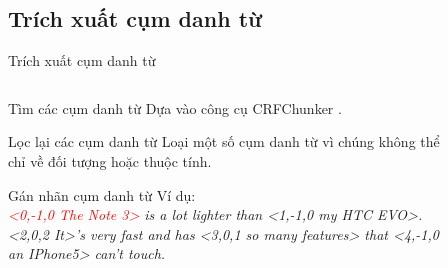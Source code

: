 \documentclass[9pt,xcolor=table,hyperref=unicode]{beamer}
\begin{document}
	\subsection{Trích xuất cụm danh từ}
	\begin{frame}{Trích xuất cụm danh từ}			
		\begin{columns}[t]
			\begin{column}{0.7\textwidth}
			   	\begin{block}{Tìm các cụm danh từ}
	   				Dựa vào công cụ CRFChunker \footnotemark.
				\end{block}
				\begin{block}{Lọc lại các cụm danh từ}
			   		Loại một số cụm danh từ vì chúng không thể chỉ về đối tượng hoặc thuộc tính.				
				\end{block}
				\begin{block}{Gán nhãn cụm danh từ}					
					Ví dụ: \\ 
					\fontsize{9pt}{9}\selectfont \textit{\textcolor{red}{<0,-1,0 The Note 3>} is a lot lighter than <1,-1,0 my HTC EVO>. <2,0,2 It>'s very fast and has <3,0,1 so many features> that <4,-1,0 an IPhone5> can't touch.} 
				\end{block}
			\end{column}
			\begin{column}{0.3\textwidth}  %
			 	\begin{figure}[H]
					\fontsize{13pt}{13}\selectfont
					\centering				
					\resizebox{30mm}{!}{}	
				\end{figure}
			\end{column}
		\end{columns}
		\begin{columns}[t]
			\begin{column}{\textwidth}				
			   	\begin{figure}[H]
					\LARGE 
					\resizebox{100mm}{!}{}										
				\end{figure}
			\end{column}			
		\end{columns}
	\end{frame}
\end{document}
